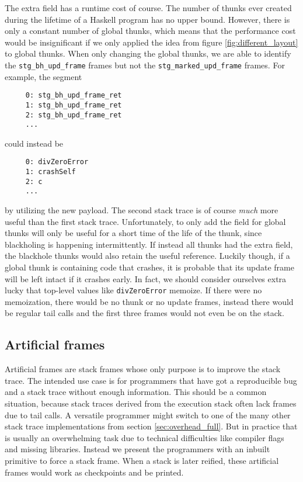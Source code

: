 The extra field has a runtime cost of course. The number of thunks
ever created during the lifetime of a Haskell program has no upper bound. However,
there is only a constant number of global thunks, which means that the
performance cost would be insignificant if we only applied the idea from
figure \ref{fig:different_layout} to global thunks. When
only changing the global thunks, we are able to identify
the \texttt{stg\_bh\_upd\_frame} frames but not the
\texttt{stg\_marked\_upd\_frame} frames. For example, the
segment

\begin{verbatim}
     0: stg_bh_upd_frame_ret
     1: stg_bh_upd_frame_ret
     2: stg_bh_upd_frame_ret
     ...
\end{verbatim}

could instead be

\begin{verbatim}
     0: divZeroError
     1: crashSelf
     2: c
     ...
\end{verbatim}

by utilizing the new payload. The second stack trace is of course
\emph{much} more useful than the first stack trace. Unfortunately,
to only add the field for global thunks will only be useful for a
short time of the life of the thunk, since blackholing is happening
intermittently. If instead all thunks had the extra field, the blackhole
thunks would also retain the useful reference. Luckily though, if a
global thunk is containing code that crashes, it is probable that its
update frame will be left intact if it crashes early. In
fact, we should consider ourselves extra lucky that top-level values
like \texttt{divZeroError} memoize. If there were no memoization,
there would be no thunk or no update frames, instead there would be
regular tail calls and the first three frames would not even be on the stack.

\subsection{Artificial frames}

%

Artificial frames are stack frames whose only purpose is to improve
the stack trace. The intended use case is for programmers that have
got a reproducible bug and a stack trace without enough information.
This should be a common situation, because stack traces derived from the
execution stack often lack frames due to tail calls. A versatile
programmer might switch to one of the many other stack trace
implementations from section \ref{sec:overhead_full}.
But in practice that is usually an overwhelming task
due to technical difficulties like compiler flags and missing libraries. Instead we present
the programmers with an inbuilt primitive to force a stack frame.
When a stack is later reified, these artificial frames would work as
checkpoints and be printed.

